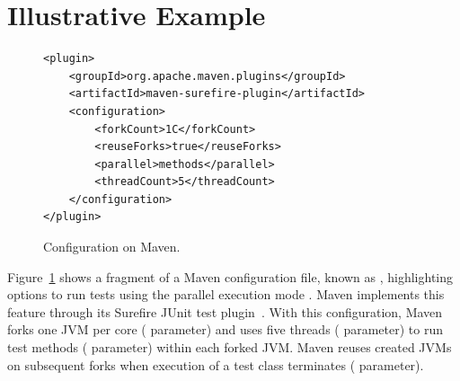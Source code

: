 \section{Illustrative Example}

\begin{figure}[h!]
\centering
\begin{minipage}{0.6\textwidth}
\scriptsize
{}
\begin{lstlisting}
<plugin>
    <groupId>org.apache.maven.plugins</groupId>
    <artifactId>maven-surefire-plugin</artifactId>
    <configuration>
        <forkCount>1C</forkCount>
        <reuseForks>true</reuseForks>
        <parallel>methods</parallel>
        <threadCount>5</threadCount>
    </configuration>
</plugin>
\end{lstlisting}
\end{minipage}
  \caption{\label{fig:surefire} Configuration \ForkParMeth{} on Maven.}
\end{figure}

Figure~\ref{fig:surefire} shows a
fragment of a Maven configuration file, known as \pomf{}, highlighting
options to run tests using the parallel execution mode \ForkParMeth{}.
Maven implements this feature through its Surefire JUnit test
plugin~\cite{maven-surefire-plugin}.  With this configuration, Maven
forks one JVM per core ( parameter) and uses five
threads ( parameter) to run test methods
( parameter) within each forked JVM.  Maven reuses
created JVMs on subsequent forks when execution of a test class
terminates ( parameter).

